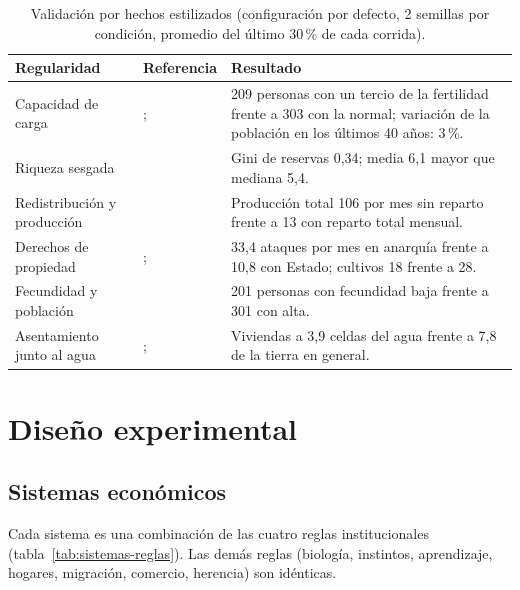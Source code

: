 \documentclass[11pt,a4paper]{article}
\begin{document}
\begin{table}[htbp]\centering\small
\caption{Validación por hechos estilizados (configuración por defecto, 2 semillas por condición, promedio del último 30\,\% de cada corrida).}\label{tab:validacion}
\begin{tabular}{p{3.6cm}p{3.6cm}p{7.6cm}}
\toprule
Regularidad & Referencia & Resultado \\
\midrule
Capacidad de carga & \citet{malthus1798}; \citet{epstein1996growing} & 209 personas con un tercio de la fertilidad frente a 303 con la normal; variación de la población en los últimos 40 años: 3\,\%. \\
Riqueza sesgada & \citet{epstein1996growing} & Gini de reservas 0{,}34; media 6{,}1 mayor que mediana 5{,}4. \\
Redistribución y producción & \citet{okun1975} & Producción total 106 por mes sin reparto frente a 13 con reparto total mensual. \\
Derechos de propiedad & \citet{demsetz1967}; \citet{north1990} & 33{,}4 ataques por mes en anarquía frente a 10{,}8 con Estado; cultivos 18 frente a 28. \\
Fecundidad y población & \citet{verhulst1838} & 201 personas con fecundidad baja frente a 301 con alta. \\
Asentamiento junto al agua & \citet{thunen1826}; \citet{christaller1933} & Viviendas a 3{,}9 celdas del agua frente a 7{,}8 de la tierra en general. \\
\bottomrule
\end{tabular}
\end{table}

\section{Diseño experimental}
\subsection{Sistemas económicos}
Cada sistema es una combinación de las cuatro reglas institucionales (tabla~\ref{tab:sistemas-reglas}). Las demás reglas (biología, instintos, aprendizaje, hogares, migración, comercio, herencia) son idénticas.
\end{document}
